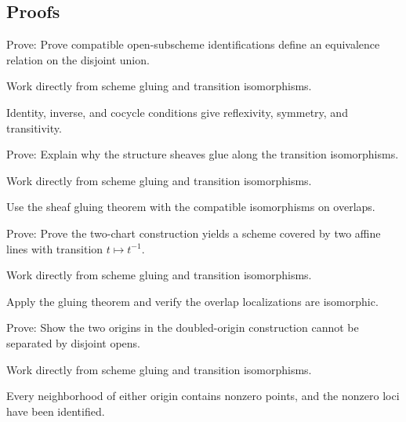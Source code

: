 \subsection*{Proofs}

\begin{exercise}\label{exr:vi20-expand-06}
Prove: Prove compatible open-subscheme identifications define an equivalence relation on the disjoint union.
\end{exercise}
\begin{hint}
Work directly from scheme gluing and transition isomorphisms.
\end{hint}
\begin{solution}
Identity, inverse, and cocycle conditions give reflexivity, symmetry, and transitivity.
\end{solution}

\begin{exercise}\label{exr:vi20-expand-07}
Prove: Explain why the structure sheaves glue along the transition isomorphisms.
\end{exercise}
\begin{hint}
Work directly from scheme gluing and transition isomorphisms.
\end{hint}
\begin{solution}
Use the sheaf gluing theorem with the compatible isomorphisms on overlaps.
\end{solution}

\begin{exercise}\label{exr:vi20-expand-08}
Prove: Prove the two-chart construction yields a scheme covered by two affine lines with transition $t\mapsto t^{-1}$.
\end{exercise}
\begin{hint}
Work directly from scheme gluing and transition isomorphisms.
\end{hint}
\begin{solution}
Apply the gluing theorem and verify the overlap localizations are isomorphic.
\end{solution}

\begin{exercise}\label{exr:vi20-expand-09}
Prove: Show the two origins in the doubled-origin construction cannot be separated by disjoint opens.
\end{exercise}
\begin{hint}
Work directly from scheme gluing and transition isomorphisms.
\end{hint}
\begin{solution}
Every neighborhood of either origin contains nonzero points, and the nonzero loci have been identified.
\end{solution}

